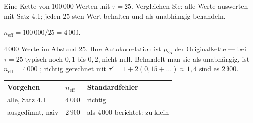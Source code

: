 \begin{aufgabe}
Eine Kette von $100\,000$ Werten mit $\tau = 25$. Vergleichen Sie: alle Werte auswerten mit Satz 4.1; jeden $25$-sten Wert behalten und als unabhängig behandeln.

\loesung
{}
$n_{\text{eff}} = 100\,000/25 = 4\,000$.

$4\,000$ Werte im Abstand $25$. Ihre Autokorrelation ist $\rho_{25}$ der Originalkette --- bei $\tau = 25$ typisch noch $0{,}1$ bis $0{,}2$, nicht null. Behandelt man sie als unabhängig, ist $n_{\text{eff}} = 4\,000$ ; richtig gerechnet mit $\tau' = 1 + 2(0{,}15 + \ldots) \approx 1{,}4$ sind es $2\,900$.

\begin{center}
{\small
\renewcommand{\arraystretch}{1.48}
\begin{tabular}{@{}P{3.4cm}P{2.0cm}P{2.6cm}@{}}
\toprule
\textbf{Vorgehen} & $n_{\text{eff}}$ & \textbf{Standardfehler}\\
\midrule
alle, Satz 4.1 & $4\,000$ & richtig\\
ausgedünnt, naiv & $2\,900$ & als $4\,000$ berichtet: zu klein\\
\bottomrule
\end{tabular}}
\end{center}

\begin{center}
\begin{minipage}{0.88\textwidth}
\end{minipage}
\end{center}
\end{aufgabe}

